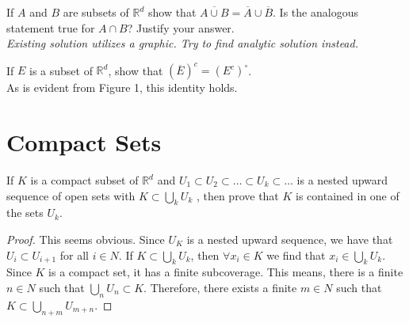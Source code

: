 \documentclass[12pt]{book}
\newcommand{\R}{\mathbb{R}}
\newenvironment{exercise}[2][Exercise]{\begin{trivlist}
\item[\hskip \labelsep {\bfseries #1}\hskip \labelsep {\bfseries #2.}]}{\end{trivlist}}
\begin{document}
\begin{exercise}{7.3.9}
If $A$ and $B$ are subsets of $\R^d$ show that $\overline{A \cup B} = \overline{A} \cup \overline{B}$. Is the analogous statement true for $A \cap B$? Justify your answer. \\


\emph{Existing solution utilizes a graphic. Try to find analytic solution instead.}
\end{exercise}


\begin{exercise}{7.3.15}
If $E$ is a subset of $\R^d$, show that $(\overline{E})^c = (E^c)^\circ$. \\

As is evident from Figure 1, this identity holds.
\end{exercise}



\section{Compact Sets}


\begin{exercise}{7.4.1}
If $K$ is a compact subset of $\R^d$ and $U_1 \subset U_2 \subset \hdots \subset U_k \subset \hdots$ is a
nested upward sequence of open sets with $K \subset \bigcup_k U_k$ , then prove that $K$ is contained in one of the sets $U_k$.



\begin{proof}
    This seems obvious. Since $U_K$ is a nested upward sequence, we have that $U_i \subset U_{i+1}$ for all $i\in N$. If $K \subset \bigcup_k U_k$, then $\forall x_i \in K$ we find that $x_i \in \bigcup_k U_k$. Since $K$ is a compact set, it has a finite subcoverage. This means, there is a finite $n \in N$ such that $\bigcup_n U_n \subset K$. Therefore, there exists a finite $m \in N$ such that $K \subset \bigcup_{n+m} U_{m+n}$.  
\end{proof}
\end{exercise}
\end{document}
